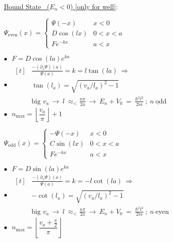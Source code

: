 \documentclass[12pt]{article}
\begin{document}
\vspace{15pt} \noindent
\underline{Bound State \ (\(E_n<0\)) {\scriptsize[only for well]}}:\\[15pt]
\begin{minipage}[t]{.49\textwidth}
    \setlength{\parindent}{.5cm}
    \(\Psi_\text{even}(x) = \begin{cases}
        \Psi(-x)    &   x < 0\\[5pt]
        D \cos(lx)   &   0 < x < a \\[5pt]
        F e^{-kx}   &   a < x 
    \end{cases}\)
    
    \vspace{20pt}
    \(\bullet \ \ \ F = D \cos(la) e^{ka}\)\\[10pt]
    \hspace{18pt} \(\bullet \ \ \ \begin{aligned}[t]
        &\tfrac{-(\partial_x \Psi)(a)}{\Psi(a)} = k = l \tan(la) \ \Rightarrow\\[5pt]
        &\tan(l_a) = \sqrt{ (v_a / l_a)^2 - 1}
            \hspace{18pt} \ \ \\[5pt]
        &\scriptstyle \text{big } v_a \ \rightarrow \ l\ \approx_< \tfrac{n \pi}{2a}
            \ \rightarrow \ E_n + V_0\ =\ \tfrac{\hbar^2 l^2}{2m}\ ;\ \underline{n\ \text{odd}}
    \end{aligned}\)\\[5pt]
    \hspace{18pt} \(\bullet \ \ \ \boxed{ n_\text{max} = \left\lfloor \dfrac{v_a}{\pi} \right\rfloor + 1} \)
\end{minipage}
\begin{minipage}[t]{.5\textwidth}
    \setlength{\parindent}{.5cm}
    \(\Psi_\text{odd}(x) = \begin{cases}
        - \Psi(-x)    &   x < 0\\[5pt]
        C \sin(lx)   &   0 < x < a \\[5pt]
        F e^{-kx}   &   a < x 
    \end{cases}\)
    
    \vspace{20pt}
    \(\bullet \ \ \ F = D \sin(la) e^{ka}\)\\[10pt]
    \hspace{18pt} \(\bullet \ \ \ \begin{aligned}[t]
        &\tfrac{-(\partial_x \Psi)(a)}{\Psi(a)} = k = - l \cot(la) \ \Rightarrow\\[5pt]
        &-\cot(l_a) = \sqrt{ (v_a / l_a)^2 - 1} \\[5pt]
        &\scriptstyle \text{big } v_a \ \rightarrow \ l\ \approx_< \tfrac{n \pi}{2a}
            \ \rightarrow \ E_n + V_0\ =\ \tfrac{\hbar^2 l^2}{2m}\ ;\ \underline{n\ \text{even}}
    \end{aligned}\)\\[5pt]  
    \hspace{18pt}\(\bullet \ \ \ \boxed{ n_\text{max} = \left\lfloor \dfrac{v_a + \tfrac{\pi}{2}}{\pi} \right\rfloor } \) 
\end{minipage}
\end{document}
